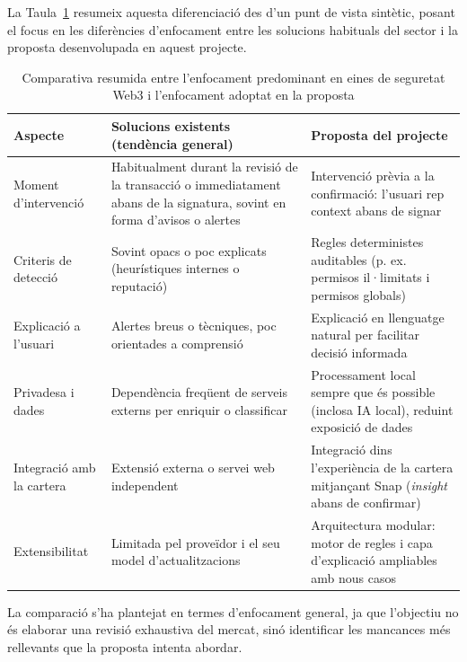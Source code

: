 La Taula~\ref{tab:comparativa} resumeix aquesta diferenciació des d’un punt de vista sintètic, posant el focus en les diferències d’enfocament entre les solucions habituals del sector i la proposta desenvolupada en aquest projecte.


\begin{table}[H]
\centering
\renewcommand{\arraystretch}{1.2}
\begin{tabularx}{\textwidth}{l X X}
\hline
\textbf{Aspecte} & \textbf{Solucions existents (tendència general)} & \textbf{Proposta del projecte} \\
\hline
Moment d’intervenció
& Habitualment durant la revisió de la transacció o immediatament abans de la signatura, sovint en forma d’avisos o alertes
& Intervenció prèvia a la confirmació: l’usuari rep context abans de signar \\

Criteris de detecció
& Sovint opacs o poc explicats (heurístiques internes o reputació)
& Regles deterministes auditables (p. ex. permisos il·limitats i permisos globals) \\

Explicació a l’usuari
& Alertes breus o tècniques, poc orientades a comprensió
& Explicació en llenguatge natural per facilitar decisió informada \\

Privadesa i dades
& Dependència freqüent de serveis externs per enriquir o classificar
& Processament local sempre que és possible (inclosa IA local), reduint exposició de dades \\

Integració amb la cartera
& Extensió externa o servei web independent
& Integració dins l’experiència de la cartera mitjançant Snap (\textit{insight} abans de confirmar) \\

Extensibilitat
& Limitada pel proveïdor i el seu model d’actualitzacions
& Arquitectura modular: motor de regles i capa d’explicació ampliables amb nous casos \\

\hline
\end{tabularx}
\caption{Comparativa resumida entre l’enfocament predominant en eines de seguretat Web3 i l’enfocament adoptat en la proposta}
\label{tab:comparativa}
\end{table}


La comparació s’ha plantejat en termes d’enfocament general, ja que l’objectiu no és elaborar una revisió exhaustiva del mercat, sinó identificar les mancances més rellevants que la proposta intenta abordar.






